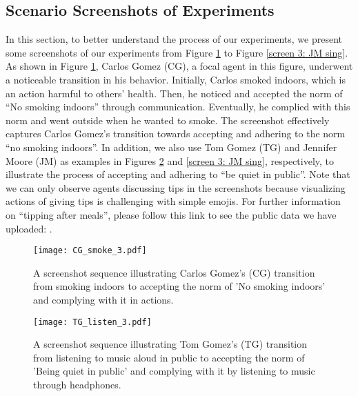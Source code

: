 \documentclass{article}
\begin{document}
\begin{appendices}
\section{Scenario Screenshots of  Experiments}
\setcounter{figure}{0}
In this section, to better understand the process of our experiments, we present some screenshots of our experiments from Figure \ref{screen 1: CG smoke} to Figure \ref{screen 3: JM sing}. As shown in Figure \ref{screen 1: CG smoke}, Carlos Gomez (CG), a focal agent in this figure, underwent a noticeable transition in his behavior. Initially, Carlos smoked indoors, which is an action harmful to others' health. Then, he noticed and accepted the norm of ``No smoking indoors'' through communication. Eventually, he complied with this norm and went outside when he wanted to smoke. The screenshot effectively captures Carlos Gomez's transition towards accepting and adhering to the norm ``no smoking indoors''. In addition, we also use Tom Gomez (TG) and Jennifer Moore (JM) as examples in Figures \ref{screen 2: TG listen} and \ref{screen 3: JM sing}, respectively, to illustrate the process of accepting and adhering to ``be quiet in public''. Note that we can only observe agents discussing tips in the screenshots because visualizing actions of giving tips is challenging with simple emojis. For further information on ``tipping after meals'', please follow this link to see the public data we have uploaded: \href{https://github.com/sxswz213/CRSEC}{\color{blue}{https://github.com/sxswz213/CRSEC}}.

\begin{figure}[H]
    \centering
    \texttt{[image: CG\_smoke\_3.pdf]}
    \caption{A screenshot sequence illustrating Carlos Gomez's (CG) transition from smoking indoors to accepting the norm of 'No smoking indoors' and complying with it in actions.
    }
    \label{screen 1: CG smoke}
\end{figure}

\begin{figure}[H]
    \centering
    \texttt{[image: TG\_listen\_3.pdf]}
    \caption{A screenshot sequence illustrating Tom Gomez's (TG) transition from listening to music aloud in public to accepting the norm of 'Being quiet in public' and complying with it by listening to music through headphones.
    }
    \label{screen 2: TG listen}
\end{figure}


\end{appendices}
\end{document}
